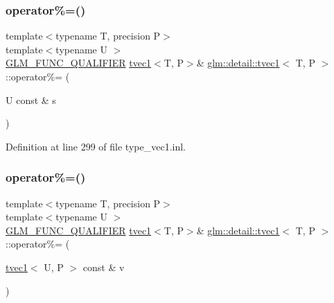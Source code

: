 \mbox{\label{structglm_1_1detail_1_1tvec1_a9a958fd9f0255f2d40924adcb2e9eb0c}} 
\subsubsection{\texorpdfstring{operator\%=()}{operator\%=()}\hspace{0.1cm}{\footnotesize\ttfamily [3/4]}}
{\footnotesize\ttfamily template$<$typename T, precision P$>$ \\
template$<$typename U $>$ \\
\hyperlink{setup_8hpp_a33fdea6f91c5f834105f7415e2a64407}{G\+L\+M\+\_\+\+F\+U\+N\+C\+\_\+\+Q\+U\+A\+L\+I\+F\+I\+ER} \hyperlink{structglm_1_1detail_1_1tvec1}{tvec1}$<$T, P$>$\& \hyperlink{structglm_1_1detail_1_1tvec1}{glm\+::detail\+::tvec1}$<$ T, P $>$\+::operator\%= (\begin{DoxyParamCaption}\item[{U const \&}]{s }\end{DoxyParamCaption})}



Definition at line 299 of file type\+\_\+vec1.\+inl.

\mbox{\label{structglm_1_1detail_1_1tvec1_a711db33765785eacc65e313535211c76}} 
\subsubsection{\texorpdfstring{operator\%=()}{operator\%=()}\hspace{0.1cm}{\footnotesize\ttfamily [4/4]}}
{\footnotesize\ttfamily template$<$typename T, precision P$>$ \\
template$<$typename U $>$ \\
\hyperlink{setup_8hpp_a33fdea6f91c5f834105f7415e2a64407}{G\+L\+M\+\_\+\+F\+U\+N\+C\+\_\+\+Q\+U\+A\+L\+I\+F\+I\+ER} \hyperlink{structglm_1_1detail_1_1tvec1}{tvec1}$<$T, P$>$\& \hyperlink{structglm_1_1detail_1_1tvec1}{glm\+::detail\+::tvec1}$<$ T, P $>$\+::operator\%= (\begin{DoxyParamCaption}\item[{\hyperlink{structglm_1_1detail_1_1tvec1}{tvec1}$<$ U, P $>$ const \&}]{v }\end{DoxyParamCaption})}



